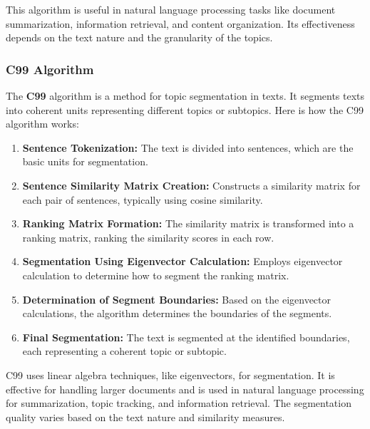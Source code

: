 This algorithm is useful in natural language processing tasks like document summarization, information retrieval, and content organization. Its effectiveness depends on the text nature and the granularity of the topics.



\subsubsection{C99 Algorithm}


The \textbf{C99} algorithm is a method for topic segmentation in texts. It segments texts into coherent units representing different topics or subtopics. Here is how the C99 algorithm works:

\begin{enumerate}
    \item \textbf{Sentence Tokenization:} The text is divided into sentences, which are the basic units for segmentation.
    \item \textbf{Sentence Similarity Matrix Creation:} Constructs a similarity matrix for each pair of sentences, typically using cosine similarity.
    \item \textbf{Ranking Matrix Formation:} The similarity matrix is transformed into a ranking matrix, ranking the similarity scores in each row.
    \item \textbf{Segmentation Using Eigenvector Calculation:} Employs eigenvector calculation to determine how to segment the ranking matrix.
    \item \textbf{Determination of Segment Boundaries:} Based on the eigenvector calculations, the algorithm determines the boundaries of the segments.
    \item \textbf{Final Segmentation:} The text is segmented at the identified boundaries, each representing a coherent topic or subtopic.
\end{enumerate}

C99 uses linear algebra techniques, like eigenvectors, for segmentation. It is effective for handling larger documents and is used in natural language processing for summarization, topic tracking, and information retrieval. The segmentation quality varies based on the text nature and similarity measures.













